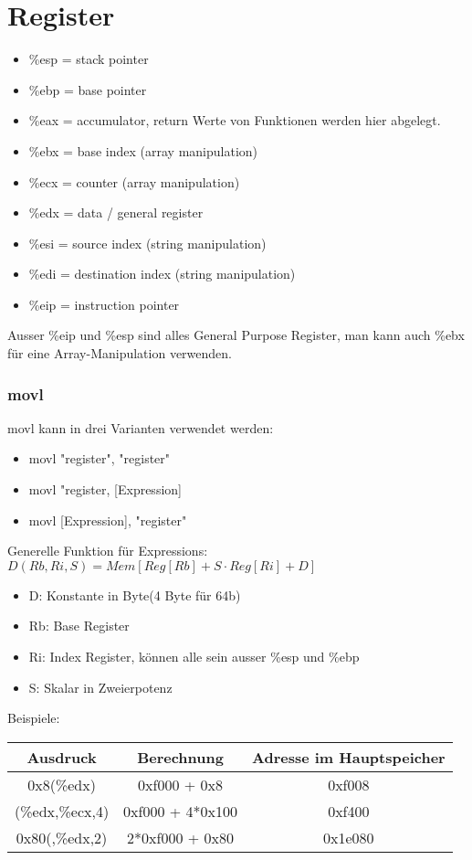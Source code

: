 \documentclass[a4paper, 11pt]{article}
\begin{document}
\section{Register}
\begin{itemize}
	\item \%esp = stack pointer
	\item \%ebp = base pointer
	\item \%eax = accumulator, return Werte von Funktionen werden hier abgelegt.
	\item \%ebx = base index (array manipulation)
	\item \%ecx = counter (array manipulation)
	\item \%edx = data / general register
	\item \%esi = source index (string manipulation)
	\item \%edi = destination index (string manipulation)
	\item \%eip = instruction pointer
\end{itemize}
Ausser \%eip und \%esp sind alles General Purpose Register, man kann auch \%ebx für eine Array-Manipulation verwenden.

\subsubsection{movl}
movl kann in drei Varianten verwendet werden:
\begin{itemize}
	\item movl "register", "register"
	\item movl "register, [Expression]
	\item movl [Expression], "register"
\end{itemize}

Generelle Funktion für Expressions: $D(Rb,Ri,S)= Mem[Reg[Rb]+S \cdot Reg[Ri]+D]$\\
\begin{itemize}
	\item D: Konstante in Byte(4 Byte für 64b)
	\item Rb: Base Register
	\item Ri: Index Register, können alle sein ausser \%esp und \%ebp
	\item S: Skalar in Zweierpotenz
\end{itemize}

Beispiele:
\begin{tabular}{|c|c|c|}
	\hline
	Ausdruck & Berechnung & Adresse im Hauptspeicher \\\hline\hline
	0x8(\%edx) & 0xf000 + 0x8 & 0xf008 \\\hline
	(\%edx,\%ecx,4)&0xf000 + 4*0x100&0xf400\\\hline
	0x80(,\%edx,2)&2*0xf000 + 0x80 & 0x1e080\\\hline
\end{tabular}
\end{document}
